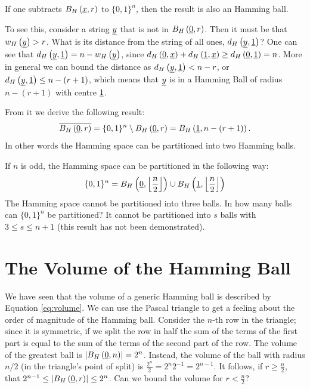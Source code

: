 If one subtracts $B_H\left(\underline{x}, r\right)$ to $\{0, 1\}^n$, then the result is also an Hamming ball.

To see this, consider a string $\underline{y}$ that is not in $B_H\left(\underline{0}, r\right)$.
Then it must be that $w_H\left(\underline{y}\right) > r$.
What is its distance from the string of all ones, \ie $d_H \left({\underline{y},\underline{1}}\right)$?
One can see that $d_H \left({\underline{y},\underline{1}}\right) = n - w_H\left(\underline{y}\right)$, since $d_H \left({\underline{0},\underline{x}}\right) + d_H \left({\underline{1},\underline{x}}\right) \ge d_H \left({\underline{0},\underline{1}}\right) = n$.
More in general we can bound the distance as $d_H \left({\underline{y},\underline{1}}\right) < n - r$, or $d_H \left({\underline{y},\underline{1}}\right) \le n - (r+1)$, which means that $\underline{y}$ is in a Hamming Ball of radius $n - (r+1)$ with centre $\underline{1}$.

From it we derive the following result:
\begin{equation*}
	\overline{B_H\left(\underline{0}, r\right)} = \{0,1\}^{n} \setminus B_H\left(\underline{0}, r\right) = B_H\left(\underline{1}, n - (r+1)\right).
\end{equation*}
In other words the Hamming space can be partitioned into two Hamming balls.

If $n$ is odd, the Hamming space can be partitioned in the following way:
\begin{equation*}
	\{0, 1\}^n = B_H\left(\underline{0}, \left\lfloor{\frac{n}{2}}\right\rfloor\right) \cup B_H\left(\underline{1}, \left\lfloor{\frac{n}{2}}\right\rfloor\right)
\end{equation*}
The Hamming space cannot be partitioned into three balls.
In how many balls can $\{0, 1\}^n$ be partitioned?
It cannot be partitioned into $s$ balls with $3 \leq s \leq n + 1$ (this result has not been demonstrated).

\section{The Volume of the Hamming Ball}

We have seen that the volume of a generic Hamming ball is described by Equation \ref{eq:volume}.
We can use the Pascal triangle to get a feeling about the order of magnitude of the Hamming ball.
Consider the $n$-th row in the triangle; since it is symmetric, if we split the row in half the sum of the terms of the first part is equal to the sum of the terms of the second part of the row.
The volume of the greatest ball is $\left|{B_H\left(\underline{0}, n\right)}\right| = 2^n$.
Instead, the volume of the ball with radius $n/2$ (in the triangle's point of split) is $\frac{2^n}{2} = 2^n2^{-1} = 2^{n-1}$.
It follows, if $r \ge \frac{n}{2}$, that $2^{n-1} \le \left|{B_H\left(\underline{0}, r\right)}\right| \le 2^n$.
Can we bound the volume for $r < \frac{n}{2}$?

